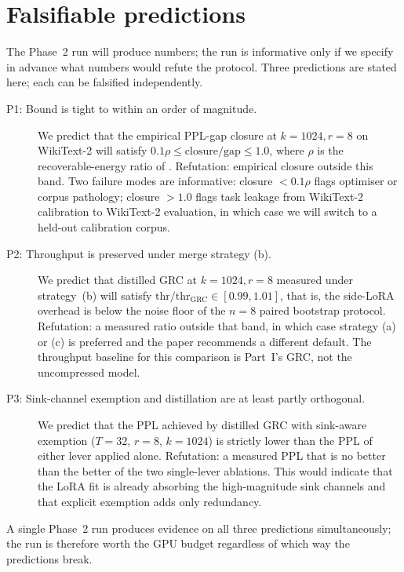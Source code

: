 \documentclass[11pt]{article}
\begin{document}
\section{Falsifiable predictions}
\label{sec:predictions}

The Phase~2 run will produce numbers; the run is informative only if we
specify in advance what numbers would refute the protocol. Three
predictions are stated here; each can be falsified independently.

\begin{description}
\item[P1: Bound is tight to within an order of magnitude.]
We predict that the empirical PPL-gap closure at $k{=}1024, r{=}8$ on
WikiText-2 will satisfy $0.1\rho \le \text{closure}/\text{gap} \le 1.0$,
where $\rho$ is the recoverable-energy ratio of .
Refutation: empirical closure outside this band. Two failure modes are
informative: closure $<0.1\rho$ flags optimiser or corpus pathology;
closure $>1.0$ flags task leakage from WikiText-2 calibration to
WikiText-2 evaluation, in which case we will switch to a held-out
calibration corpus.

\item[P2: Throughput is preserved under merge strategy (b).]
We predict that distilled GRC at $k{=}1024, r{=}8$ measured under
strategy~(b) will satisfy $\text{thr} / \text{thr}_{\text{GRC}} \in [0.99, 1.01]$,
that is, the side-LoRA overhead is below the noise floor of the
$n{=}8$ paired bootstrap protocol. Refutation: a measured ratio outside
that band, in which case strategy (a) or (c) is preferred and the
paper recommends a different default. The throughput baseline for
this comparison is Part~I's GRC, not the uncompressed model.

\item[P3: Sink-channel exemption and distillation are at least
partly orthogonal.] We predict that the PPL achieved by distilled
GRC with sink-aware exemption ($T{=}32$, $r{=}8$, $k{=}1024$) is
strictly lower than the PPL of either lever applied alone.
Refutation: a measured PPL that is no better than the better of the
two single-lever ablations. This would indicate that the LoRA fit is
already absorbing the high-magnitude sink channels and that explicit
exemption adds only redundancy.
\end{description}

A single Phase~2 run produces evidence on all three predictions
simultaneously; the run is therefore worth the GPU budget regardless of
which way the predictions break.
\end{document}
